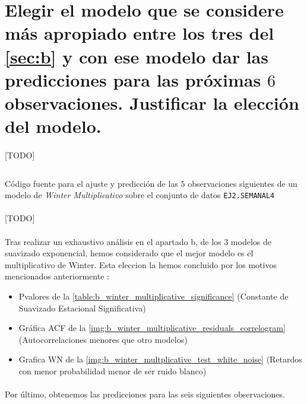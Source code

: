 \documentclass[a4paper, spanish]{article}
\begin{document}
  \section{Elegir el modelo que se considere más apropiado entre los tres del \autoref{sec:b} y con ese modelo dar las predicciones para las próximas $6$ observaciones. Justificar la elección del modelo.}
  \label{sec:c}

    \paragraph{}
    [TODO]

    \begin{listing}[htb!]
      \centering
      \inputminted{SAS}{./res/code/c-01-prediction.sas}
      \caption{Código fuente para el ajuste y predicción de las $5$ observaciones siguientes de un modelo de \emph{Winter Multiplicativo} sobre el conjunto de datos \texttt{EJ2.SEMANAL4}}
      \label{code:winter_multiplicative_prediction}
    \end{listing}

    \paragraph{}
    [TODO]

    \paragraph{}
    Tras realizar un exhaustivo análisis en el apartado b, de los 3 modelos de suavizado exponencial, hemos considerado que el mejor modelo es el multiplicativo de Winter.
    Esta eleccion la hemos concluido por los motivos mencionados anteriormente :

    \begin{itemize}
      \item Pvalores de la \autoref{table:b_winter_multiplicative_significance} (Constante de Suavizado Estacional Significativa)
      \item Gráfica ACF de la \autoref{img:b_winter_multiplicative_residuals_correlogram} (Autocorrelaciones menores que otro modelos)
      \item Grafica WN de la \autoref{img:b_winter_multplicative_test_white_noise} (Retardos con menor probabilidad menor de ser ruido blanco)
    \end{itemize}

    \paragraph{}
    Por último, obtenemos las predicciones para las seis siguientes observaciones.
\end{document}
